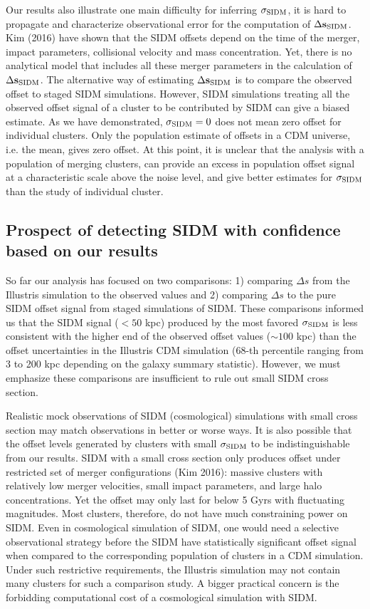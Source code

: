 Our results also illustrate one main difficulty for inferring $\sigma_{\rm SIDM}$, 
it is hard to propagate and characterize observational error  
for the computation of $\Delta {\bf s}_{{\rm SIDM}}$. Kim  (2016) have shown 
that the SIDM offsets depend on the time of the 
merger, impact parameters, collisional velocity and mass concentration. 
Yet, there is no analytical model that includes all these merger
parameters in the calculation of $\Delta {\bf s}_{{\rm SIDM}}$.  
The alternative way of estimating $\Delta {\bf s}_{{\rm SIDM}}$ is to compare the observed
offset to staged SIDM simulations.
However, SIDM simulations treating all the observed offset signal of a cluster 
to be contributed by SIDM can give a biased estimate.  
As we have demonstrated, $\sigma_{\rm SIDM} = 0$ does not mean zero offset for
individual clusters.  
Only the population estimate of offsets in a CDM universe, i.e. the mean,
gives zero offset.  
At this point, it is unclear that the analysis with a population of
merging clusters, can provide an excess in population offset signal at a
characteristic scale above the noise level, and give 
better estimates for $\sigma_{\rm
SIDM}$ than the study of individual cluster.  


\subsection{Prospect of detecting SIDM with confidence based on our results} 
\label{subsec:limitation_of_pvalue}
  
So far our analysis has focused on two comparisons: 1) comparing $\Delta s$ from
the Illustris simulation to the observed values and 2) comparing $\Delta s$ to  
the pure SIDM offset signal from staged simulations of SIDM. 
These comparisons informed us that the SIDM signal ($< 50$ kpc) produced by the most favored
$\sigma_{\rm SIDM}$ is less consistent with the higher end of the observed offset values ($\sim
100$ kpc) than the offset uncertainties in the Illustris CDM simulation (68-th 
percentile ranging from 3 to 200 kpc depending on the galaxy summary statistic).
However, we must emphasize these comparisons are
insufficient to rule out small SIDM cross section.  

Realistic mock observations of SIDM (cosmological) simulations 
with small cross section may match observations in better or worse ways. 
It is also possible that the offset levels generated by clusters with small
$\sigma_{\rm SIDM}$ 
to be indistinguishable from our results. 
SIDM with a small cross section only produces offset under restricted set of 
merger configurations (Kim  2016): 
massive clusters with relatively low merger velocities, small impact
parameters, and large halo concentrations. Yet the offset may only last
for below 5 Gyrs with fluctuating magnitudes.  
Most clusters, therefore, do not have much constraining power on SIDM.
Even in cosmological simulation of SIDM, one would need a selective observational strategy
before the SIDM have statistically significant offset signal when compared 
to the corresponding population of clusters in a CDM simulation. 
Under such restrictive requirements, the Illustris simulation may not contain 
many clusters for such a comparison study.  A bigger practical
concern is the forbidding computational cost of a cosmological simulation with SIDM.
 
